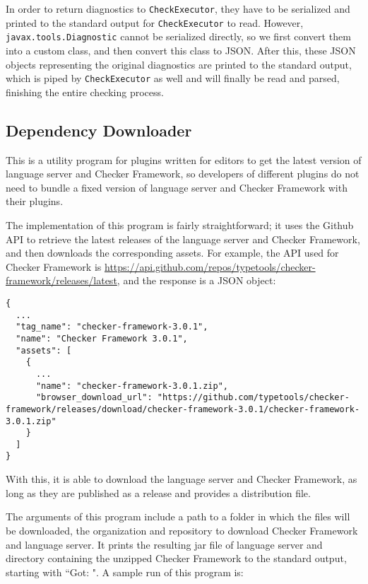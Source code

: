\documentclass{article}
\begin{document}
In order to return diagnostics to \verb|CheckExecutor|, they have to be
serialized and printed to the standard output for \verb|CheckExecutor| to read.
However, \verb|javax.tools.Diagnostic| cannot be serialized directly, so we
first convert them into a custom class, and then convert this class to JSON.
After this, these JSON objects representing the original diagnostics are printed
to the standard output, which is piped by \verb|CheckExecutor| as well and will
finally be read and parsed, finishing the entire checking process.

\subsection{Dependency Downloader}

This is a utility program for plugins written for editors to get the latest
version of language server and Checker Framework, so developers of different
plugins do not need to bundle a fixed version of language server and Checker
Framework with their plugins.

The implementation of this program is fairly straightforward; it uses the Github
API to retrieve the latest releases of the language server and Checker
Framework, and then downloads the corresponding assets. For example, the API
used for Checker Framework is
\url{https://api.github.com/repos/typetools/checker-framework/releases/latest},
and the response is a JSON object:

\begin{lstlisting}
{
  ...
  "tag_name": "checker-framework-3.0.1",
  "name": "Checker Framework 3.0.1",
  "assets": [
    {
      ...
      "name": "checker-framework-3.0.1.zip",
      "browser_download_url": "https://github.com/typetools/checker-framework/releases/download/checker-framework-3.0.1/checker-framework-3.0.1.zip"
    }
  ]
}
\end{lstlisting}

With this, it is able to download the language server and Checker Framework, as
long as they are published as a release and provides a distribution file.

The arguments of this program include a path to a folder in which the files will
be downloaded, the organization and repository to download Checker Framework and
language server. It prints the resulting jar file of language server and
directory containing the unzipped Checker Framework to the standard output,
starting with ``Got: ". A sample run of this program is:
\end{document}
